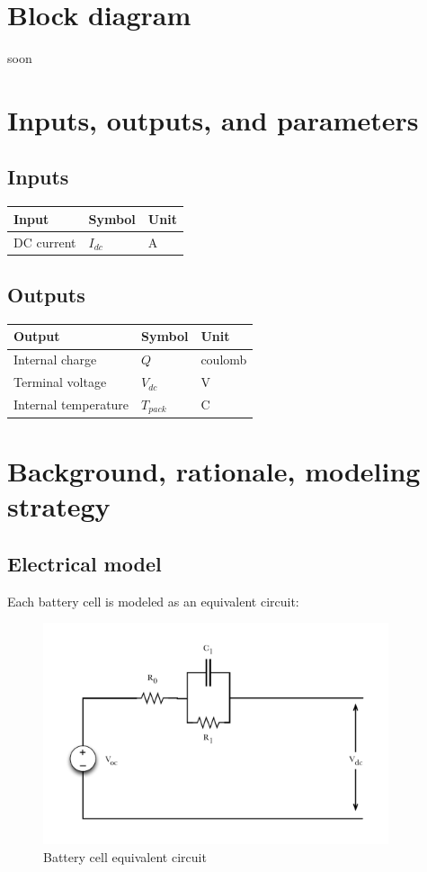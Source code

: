 \documentclass{article}
\begin{document}
\section{Block diagram}
soon

\section{Inputs, outputs, and parameters}
	\subsection{Inputs}
	\begin{tabular}{ l | l | l  }
		Input					&	Symbol		&	Unit		\\	\hline
		DC current			&	$I_{dc}$		&	A		\\
	\end{tabular}
	
	\subsection{Outputs}
	\begin{tabular}{ l | l | l  }
		Output					&	Symbol		&	Unit		\\	\hline
		Internal charge				&	$Q$			&	coulomb	\\
		Terminal voltage			&	$V_{dc}$		&	V		\\
		Internal temperature			&	$T_{pack}$	&	\degree C	\\
	\end{tabular}
		
\section{Background, rationale, modeling strategy}
	\subsection{Electrical model}
		Each battery cell is modeled as an equivalent circuit:
		
		\begin{figure}[h!]
				\centering
				\includegraphics[width=4in]{Figures/Battery_pack_equivalent_circuit}
				\caption{Battery cell equivalent circuit}
				\label{fig:battery_pack_equivalent_circuit}
		\end{figure}
		\FloatBarrier
		
\end{document}
